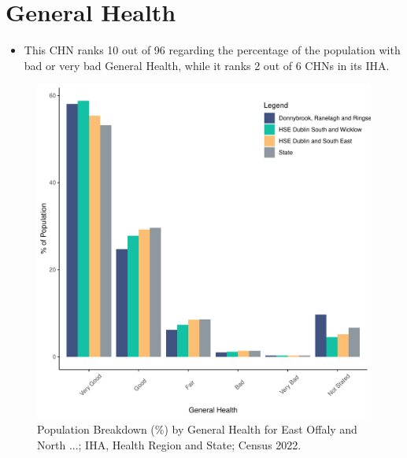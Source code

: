 \documentclass{article}
\begin{document}
\pagebreak

\section{General Health}\label{sect:GenHealth}
\begin{itemize}
\item  This CHN ranks  10 out of 96 regarding the percentage of the population with bad or very bad General Health, while it ranks   2 out of 6 CHNs in its IHA.
\end{itemize}
\begin{figure}[h]
	\centering
	\includegraphics[width = 150mm]{../figures/GenED.pdf}
	\caption{Population Breakdown (\%) by General Health for East Offaly and North ...; IHA, Health Region and State;  Census 2022.}
	\label{fig:2ae19629-1a6a-13a3-e055-000000000001}
	\end{figure}
\end{document}
